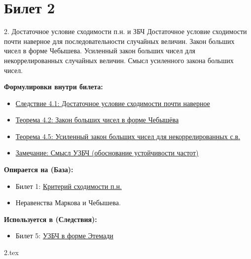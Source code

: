\documentclass[a4paper, 12pt]{article}
\newcommand{\ticketsection}[1]{\vspace{0.5em}\noindent\textbf{\textcolor{ticketdark}{\sffamily #1}}\par}
\begin{document}
\section{Билет 2}
\begin{ticketskeleton}{2. Достаточное условие сходимости п.н. и ЗБЧ}
     Достаточное условие сходимости почти наверное для последовательности случайных величин. Закон больших чисел в форме Чебышева. Усиленный закон больших чисел для некоррелированных случайных величин. Смысл усиленного закона больших чисел.


    \ticketsection{Формулировки внутри билета:}
    \begin{itemize}
        \item \hyperref[cor:suff_as]{Следствие 4.1: Достаточное условие сходимости почти наверное}
        \item \hyperref[thm:lln_cheb]{Теорема 4.2: Закон больших чисел в форме Чебышёва}
        \item \hyperref[thm:slln_uncorr]{Теорема 4.5: Усиленный закон больших чисел для некоррелированных с.в.}
        \item \hyperref[rem:slln_meaning]{Замечание: Смысл УЗБЧ (обоснование устойчивости частот)}
    \end{itemize}

    \ticketsection{Опирается на (База):}
    \begin{itemize}
        \item Билет 1: \hyperref[lem:crit_as]{Критерий сходимости п.н.}
        \item Неравенства Маркова и Чебышева.
    \end{itemize}

    \ticketsection{Используется в (Следствия):}
    \begin{itemize}
        \item Билет 5: \hyperref[thm:slln_etemadi]{УЗБЧ в форме Этемади}
    \end{itemize}
\end{ticketskeleton}
{2.tex}
\end{document}
